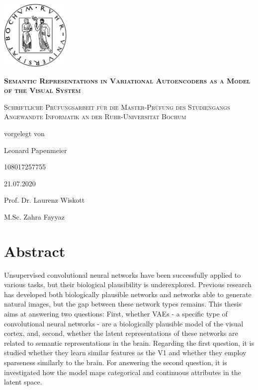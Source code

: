 \documentclass[11pt,a4paper]{article}
\let\oldsection\section
\renewcommand\section{\clearpage\oldsection}
\begin{document}
\begin{titlepage}
\centering
\includegraphics[width=0.25\textwidth]{rublogo.png}\par
{\scshape\huge\bfseries Semantic Representations in Variational Autoencoders as a Model of the Visual System \par}
{\scshape\large Schriftliche Prüfungsarbeit für die Master-Prüfung des Studiengangs Angewandte Informatik an der Ruhr-Universität Bochum\par}
\vspace{1em}
vorgelegt von\par
\vspace{2em}
Leonard Papenmeier\par 108017257755\par
\vspace{2em}
21.07.2020\par

\vfill
Prof. Dr. Laurenz Wiskott\par
M.Sc. Zahra Fayyaz


\end{titlepage}


\section*{\centering Abstract}
Unsupervised convolutional neural networks have been successfully applied to various tasks, but their biological plausibility is underexplored.
Previous research has developed both biologically plausible networks and networks able to generate natural images, but the gap between these network types remains.
This thesis aims at answering two questions:
First, whether \acp{VAE} - a specific type of convolutional neural networks - are a biologically plausible model of the visual cortex, and, second, whether the latent representations of these networks are related to semantic representations in the brain.
Regarding the first question, it is studied whether they learn similar features as the \acl{V1} and whether they employ sparseness similarly to the brain.
For answering the second question, it is investigated how the model maps categorical and continuous attributes in the latent space.
\end{document}
